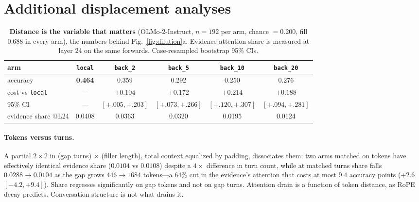 \documentclass{article}
\begin{document}
\section{Additional displacement analyses}
\label{app:displacement-detail}

\begin{table}[H]
  \centering\small
  \caption{\textbf{Distance is the variable that matters} (OLMo-2-Instruct, $n{=}192$ per arm,
  chance $=0.200$, fill $0.688$ in every arm), the numbers behind
  Fig.~\ref{fig:dilution}a. Evidence attention share is measured at layer 24 on
  the same forwards. Case-resampled bootstrap 95\% CIs.}
  \label{tab:distance}
  \setlength{\tabcolsep}{4.5pt}
  \begin{tabular}{lccccc}
    \toprule
    arm & \texttt{local} & \texttt{back\_2} & \texttt{back\_5} & \texttt{back\_10} & \texttt{back\_20}\\
    \midrule
    accuracy & \textbf{0.464} & 0.359 & 0.292 & 0.250 & 0.276\\
    cost vs \texttt{local} & --- & $+0.104$ & $+0.172$ & $+0.214$ & $+0.188$\\
    95\% CI & --- & $[+.005,+.203]$ & $[+.073,+.266]$ & $[+.120,+.307]$ & $[+.094,+.281]$\\
    evidence share @L24 & 0.0408 & 0.0363 & 0.0320 & 0.0195 & 0.0124\\
    \bottomrule
  \end{tabular}
\end{table}

\paragraph{Tokens versus turns.}
A partial $2{\times}2$ in (gap turns) $\times$ (filler length), total context equalized by
padding, dissociates them: two arms matched on tokens have effectively identical evidence
share ($0.0104$ vs $0.0108$) despite a $4\times$ difference in turn count, while at matched
turns share falls $0.0288\to0.0104$ as the gap grows $446\to1684$ tokens---a $64\%$ cut in the
evidence's attention that costs at most $9.4$ accuracy points ($+2.6$ $[-4.2,+9.4]$).
Share regresses significantly on gap tokens and not on gap turns. Attention drain is a function
of token distance, as RoPE decay predicts. Conversation structure is not what drains it.
\end{document}
